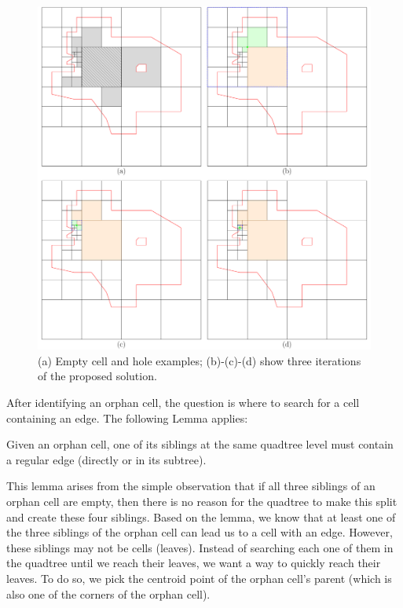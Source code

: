 \begin{figure}
    \centering
    \includegraphics[width=\textwidth]{chapterSDCEL/orphan_cells/orphan_cells}    
    \caption{(a) Empty cell and hole examples; (b)-(c)-(d) show three iterations of the proposed solution.} \label{fig:orphan_cells}
\end{figure}

After identifying an orphan cell, the question
is where to search for a cell containing an edge. The following Lemma applies:

\begin{lemma} %
Given an orphan cell, one of its siblings at the same quadtree level must contain a regular edge (directly or in its subtree). 
\end{lemma}

This lemma arises from the simple observation that if all three siblings of an orphan cell are empty, then there is no reason for the quadtree to make this split and create these four siblings. Based on the lemma, we know that at least one of the three siblings of the orphan cell can lead us to a cell with an edge.   However, these siblings may not be cells (leaves). Instead of searching each one of them in the quadtree until we reach their leaves, we want a way to quickly reach their leaves. To do so, we pick the centroid point of the orphan cell's parent (which is also one of the corners of the orphan cell).

